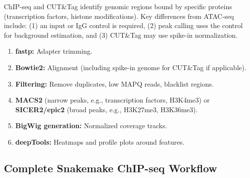 ChIP-seq and CUT\&Tag identify genomic regions bound by specific proteins (transcription factors, histone modifications). Key differences from ATAC-seq include: (1) an input or IgG control is required, (2) peak calling uses the control for background estimation, and (3) CUT\&Tag may use spike-in normalization.

\begin{enumerate}[itemsep=2pt]
  \item \textbf{fastp:} Adapter trimming.
  \item \textbf{Bowtie2:} Alignment (including spike-in genome for CUT\&Tag if applicable).
  \item \textbf{Filtering:} Remove duplicates, low MAPQ reads, blacklist regions.
  \item \textbf{MACS2} (narrow peaks, e.g., transcription factors, H3K4me3) or \textbf{SICER2/epic2} (broad peaks, e.g., H3K27me3, H3K36me3).
  \item \textbf{BigWig generation:} Normalized coverage tracks.
  \item \textbf{deepTools:} Heatmaps and profile plots around features.
\end{enumerate}

\subsection{Complete Snakemake ChIP-seq Workflow}

